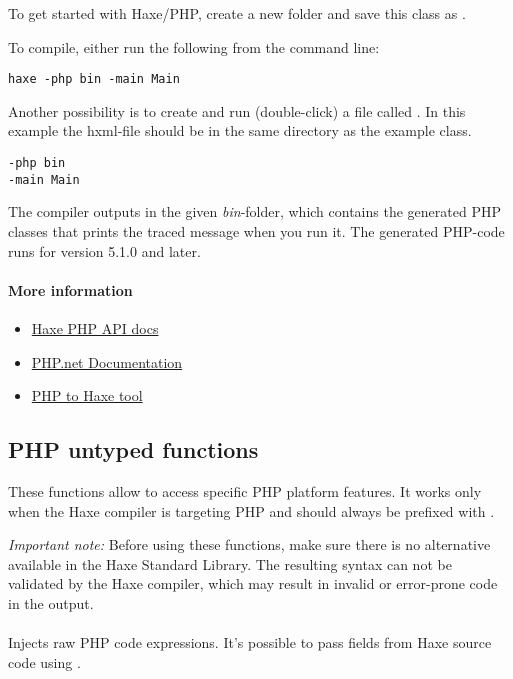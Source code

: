 To get started with Haxe/PHP, create a new folder and save this class as .


To compile, either run the following from the command line:

\begin{lstlisting}
haxe -php bin -main Main
\end{lstlisting}

Another possibility is to create and run (double-click) a file called . In this example the hxml-file should be in the same directory as the example class.

\begin{lstlisting}
-php bin
-main Main
\end{lstlisting}

The compiler outputs in the given \emph{bin}-folder, which contains the generated PHP classes that prints the traced message when you run it. The generated PHP-code runs for version 5.1.0 and later.

\paragraph{More information}

\begin{itemize}
	\item \href{http://api.haxe.org/php/}{Haxe PHP API docs}
	\item \href{http://php.net/docs.php}{PHP.net Documentation}
	\item \href{http://phptohaxe.haqteam.com/code.php}{PHP to Haxe tool}
\end{itemize}


\subsection{PHP untyped functions}
\label{target-php-untyped}

These functions allow to access specific PHP platform features. It works only when the Haxe compiler is targeting PHP and should always be prefixed with . 

\emph{Important note:} Before using these functions, make sure there is no alternative available in the Haxe Standard Library. The resulting syntax can not be validated by the Haxe compiler, which may result in invalid or error-prone code in the output.

\paragraph{}
Injects raw PHP code expressions. It's possible to pass fields from Haxe source code using .

